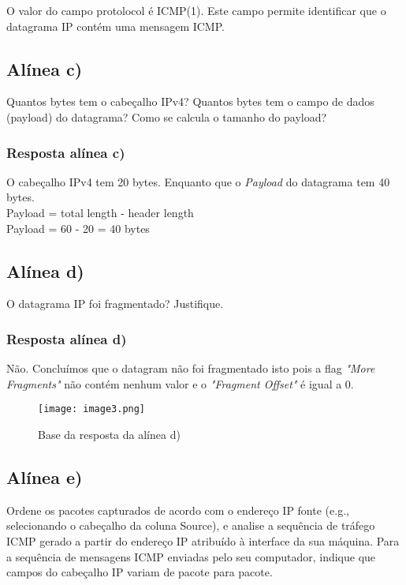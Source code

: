 \documentclass{article}
\begin{document}
O valor do campo protolocol é ICMP(1). Este campo permite identificar que o datagrama IP contém uma mensagem ICMP.

\subsection{Alínea c)}

Quantos bytes tem o cabeçalho IPv4? Quantos bytes tem o campo de dados (payload) do datagrama? Como se
calcula o tamanho do payload?

\subsubsection{Resposta alínea c)}

O cabeçalho IPv4 tem 20 bytes. Enquanto que o \emph{Payload} do datagrama tem 40 bytes.
\\
Payload = total length - header length
\\
Payload = 60 - 20 = 40 bytes

\subsection{Alínea d)}

O datagrama IP foi fragmentado? Justifique.

\subsubsection{Resposta alínea d)}

Não. Concluímos que o datagram não foi fragmentado isto pois a flag \emph{"More Fragments"} não contém nenhum valor e o \emph{"Fragment Offset"} é igual a 0.

\pagebreak
\begin{figure}[h]
    \centering
    \texttt{[image: image3.png]}
    \caption{Base da resposta da alínea d)}
\end{figure}

\subsection{Alínea e)}

 Ordene os pacotes capturados de acordo com o endereço IP fonte (e.g., selecionando o cabeçalho da coluna
Source), e analise a sequência de tráfego ICMP gerado a partir do endereço IP atribuído à interface da sua
máquina. Para a sequência de mensagens ICMP enviadas pelo seu computador, indique que campos do
cabeçalho IP variam de pacote para pacote.
\end{document}
